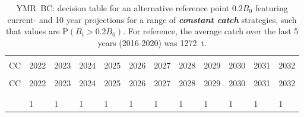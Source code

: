 \documentclass[11pt]{book}
\newcommand{\itbf}[1]{\textit{\textbf{#1}}}
\begin{document}
\begin{longtable}[c]{>{\raggedright\let\newline\\\arraybackslash\hspace{0pt}}p{0.48in}>{\raggedleft\let\newline\\\arraybackslash\hspace{0pt}}p{0.48in}>{\raggedleft\let\newline\\\arraybackslash\hspace{0pt}}p{0.48in}>{\raggedleft\let\newline\\\arraybackslash\hspace{0pt}}p{0.51in}>{\raggedleft\let\newline\\\arraybackslash\hspace{0pt}}p{0.51in}>{\raggedleft\let\newline\\\arraybackslash\hspace{0pt}}p{0.51in}>{\raggedleft\let\newline\\\arraybackslash\hspace{0pt}}p{0.51in}>{\raggedleft\let\newline\\\arraybackslash\hspace{0pt}}p{0.51in}>{\raggedleft\let\newline\\\arraybackslash\hspace{0pt}}p{0.51in}>{\raggedleft\let\newline\\\arraybackslash\hspace{0pt}}p{0.51in}>{\raggedleft\let\newline\\\arraybackslash\hspace{0pt}}p{0.51in}>{\raggedleft\let\newline\\\arraybackslash\hspace{0pt}}p{0.51in}}
  \caption{YMR~BC: decision table for an alternative reference point $0.2 B_0$ featuring current- and 10 year projections for a range of \itbf{constant catch} strategies, such that values are P$(B_t > 0.2 B_0)$.  For reference, the average catch over the last 5 years (2016-2020) was 1272~t. } \label{tab:ymr.gmu.20B0.CCs}\\  \hline\\[-2.2ex]  CC  & 2022 & 2023 & 2024 & 2025 & 2026 & 2027 & 2028 & 2029 & 2030 & 2031 & 2032 \\[0.2ex]\hline\\[-1.5ex]  \endfirsthead   \hline  CC  & 2022 & 2023 & 2024 & 2025 & 2026 & 2027 & 2028 & 2029 & 2030 & 2031 & 2032 \\[0.2ex]\hline\\[-1.5ex]  \endhead  \hline\\[-2.2ex]   \endfoot  \hline \endlastfoot  0 & 1 & 1 & 1 & 1 & 1 & 1 & 1 & 1 & 1 & 1 & 1 \\ 

\end{longtable}
\end{document}
